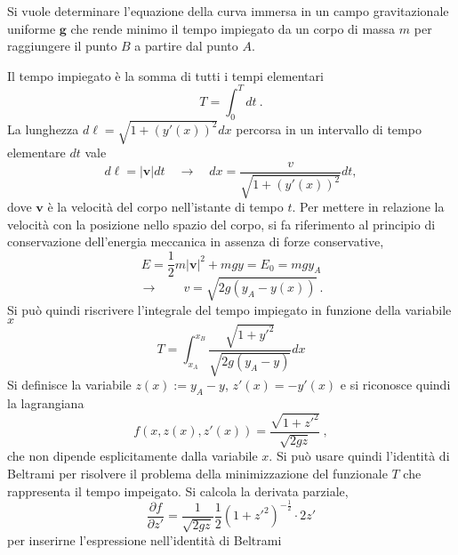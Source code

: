 \begin{example}[Brachistocrona]
    Si vuole determinare l'equazione della curva immersa in un campo gravitazionale uniforme $\mathbf{g}$ che rende minimo il tempo impiegato da un corpo di massa $m$ per raggiungere il punto $B$ a partire dal punto $A$.

\noindent
Il tempo impiegato è la somma di tutti i tempi elementari
    \begin{equation}
        T = \int_{0}^{T} dt \ .
    \end{equation}
    La lunghezza $d \ell = \sqrt{1 + (y'(x))^2} dx$ percorsa in un intervallo di tempo elementare $dt$ vale
    \begin{equation}
        d \ell = |\mathbf{v}| dt \quad \rightarrow \quad dx = \dfrac{v}{\sqrt{1+(y'(x))^2}} dt ,
    \end{equation}
dove $\mathbf{v}$ è la velocità del corpo nell'istante di tempo $t$. Per mettere in relazione la velocità con la posizione nello spazio del corpo, si fa riferimento al principio di conservazione dell'energia meccanica in assenza di forze conservative,
    \begin{equation}
        E = \frac{1}{2} m |\mathbf{v}|^2 + m g y = E_0 = m g y_A
    \end{equation} 
    \begin{equation}
        \rightarrow \qquad v = \sqrt{2 g ( y_A - y(x))} \ .
    \end{equation}
    Si può quindi riscrivere l'integrale del tempo impiegato in funzione della variabile $x$
    \begin{equation}
        T = \int_{x_A}^{x_B} \dfrac{\sqrt{1+y'^2}}{\sqrt{2 g (y_A-y)}} dx
    \end{equation}
    Si definisce la variabile $z(x):= y_A - y$, $z'(x) = -y'(x)$ e si riconosce quindi la lagrangiana 
    \begin{equation}
        f(x,z(x),z'(x)) = \dfrac{\sqrt{1+z'^2}}{\sqrt{2 g z}} \ ,
    \end{equation}
    che non dipende esplicitamente dalla variabile $x$. Si può usare quindi l'identità di Beltrami per risolvere il problema della minimizzazione del funzionale $T$ che rappresenta il tempo impeigato. Si calcola la derivata parziale,
    \begin{equation}
        \dfrac{\partial f}{\partial z'} = \dfrac{1}{\sqrt{2 g z}} \dfrac{1}{2}\left( 1 + z'^2 \right)^{-\frac{1}{2}} \cdot 2 z'
    \end{equation}
    per inserirne l'espressione nell'identità di Beltrami

\end{example}

